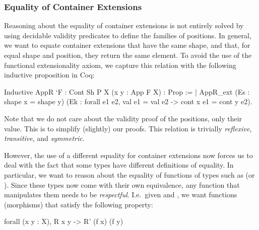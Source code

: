 \documentclass{llncs}
\begin{document}
\subsubsection{Equality of Container Extensions}
Reasoning about the equality of container extensions is not entirely solved by
using decidable validity predicates to define the families of positions. In
general, we want to equate container extensions that have the same shape, and
that, for equal shape and position, they return the same element. To avoid the
use of the functional extensionality axiom, we capture this relation with the
following inductive proposition in Coq:
\begin{coqcode}
Inductive AppR `{F : Cont Sh P} {X} (x y : App F X) : Prop :=
| AppR_ext (Es : shape x = shape y)
           (Ek : forall e1 e2, val e1 = val e2 -> cont x e1 = cont y e2).
\end{coqcode}
Note that  we do not care about the validity proof of the positions, only their
value. This is to simplify (slightly) our proofs. This relation is
trivially \emph{reflexive}, \emph{transitive}, and \emph{symmetric}.

However, the use of a different equality for container extensions now forces us
to deal with the fact that some types have different definitions of equality.
In particular, we want to reason about the equality of functions of types such
as  (or ). Since 
these types now come with their own equivalence, any function that manipulates
them needs to be \emph{respectful}. I.e.\ given 
 and ,
we want functions (morphisms) that satisfy the following property:
\begin{coqcode}
forall (x y : X), R x y -> R' (f x) (f y)
\end{coqcode}
\end{document}
